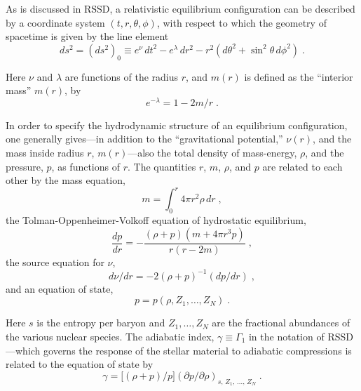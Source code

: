 \documentclass[12pt]{article}
\begin{document}
As is discussed in RSSD, a relativistic equilibrium configuration can be described by a
coordinate system $(t, r, \theta, \phi)$, with respect to which the geometry of spacetime is given
by the line element
\begin{equation}
  ds^{2} = (ds^2)_0 \equiv e^{\nu}\,dt^{2} - e^{\lambda}\,dr^{2} - r^{2}(d\theta^{2} + \sin^{2}\theta\,d\phi^{2})\;.
\label{eq:1}
\end{equation}

Here $\nu$ and $\lambda$ are functions of the radius $r$, and $m(r)$ is defined as the ``interior
mass'' $m(r)$, by
\begin{equation}
  e^{-\lambda} = 1 - 2m/r\;.
\label{eq:2}
\end{equation}

In order to specify the hydrodynamic structure of an equilibrium configuration, one
generally gives---in addition to the ``gravitational potential,'' $\nu(r)$, and the mass inside
radius $r$, $m(r)$---also the total density of mass-energy, $\rho$, and the pressure, $p$, as functions
of $r$. The quantities $r$, $m$, $\rho$, and $p$ are related to each other by the mass equation,
\begin{equation}
  m = \int_0^r 4\pi r^2 \rho \, dr \;,
\label{eq:3a}
\end{equation}
the Tolman-Oppenheimer-Volkoff equation of hydrostatic equilibrium,
\begin{equation}
  \frac{dp}{dr} = -\frac{(\rho + p)(m + 4\pi r^3 p)}{r(r - 2m)} \;,
\label{eq:3b}
\end{equation}
the source equation for $\nu$,
\begin{equation}
  d\nu/dr = -2(\rho + p)^{-1}(dp/dr) \;,
\label{eq:3c}
\end{equation}
and an equation of state,
\begin{equation}
  p = p(\rho, Z_1, \ldots, Z_N) \;.
\label{eq:3d}
\end{equation}

Here $s$ is the entropy per baryon and $Z_1, \ldots, Z_N$ are the fractional abundances of the
various nuclear species. The adiabatic index, $\gamma \equiv \Gamma_1$ in the notation of RSSD---which
governs the response of the stellar material to adiabatic compressions is related to the
equation of state by
\begin{equation}
  \gamma = \bigl[(\rho + p)/p\bigr](\partial p/\partial \rho)_{s,\, Z_1,\, \ldots,\, Z_N} \;.
\label{eq:4}
\end{equation}
\end{document}
